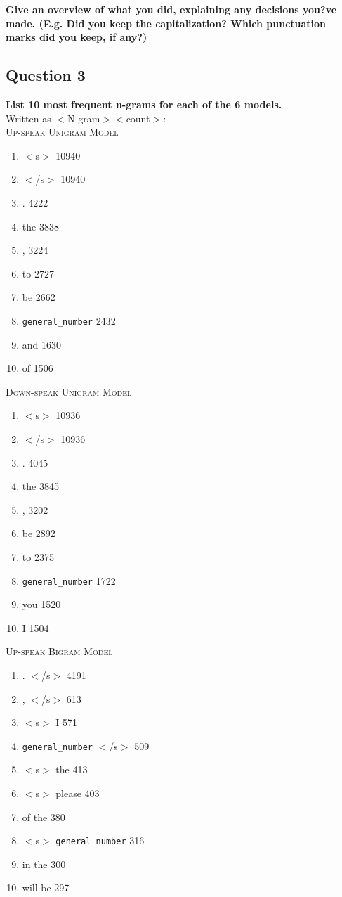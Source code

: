 \documentclass{article} %
\begin{document}
\textbf{Give an overview of what you did, explaining any decisions you?ve made. (E.g. Did you keep the capitalization? Which punctuation marks did you keep, if any?)}
\\


\lipsum[2] %

\subsection*{Question 3}

\textbf{List 10 most frequent n-grams for each of the 6 models.}
\\

Written as $<$N-gram$> <$count$>$:\\

\textsc{Up-speak Unigram Model}\\
\begin{enumerate}
\item $<$s$>$ 10940
\item $<$/s$>$ 10940
\item . 4222
\item the 3838
\item , 3224
\item to 2727
\item be 2662
\item \texttt{general\_number} 2432
\item and 1630
\item of 1506
\end{enumerate}

\textsc{Down-speak Unigram Model}\\
\begin{enumerate}
\item $<$s$>$ 10936
\item $<$/s$>$ 10936
\item . 4045
\item the 3845
\item , 3202
\item be 2892
\item to 2375
\item \texttt{general\_number} 1722
\item you 1520
\item I 1504
\end{enumerate}

\textsc{Up-speak Bigram Model}\\
\begin{enumerate}
\item . $<$/s$>$ 4191
\item , $<$/s$>$ 613
\item $<$s$>$  I 571
\item \texttt{general\_number} $<$/s$>$ 509
\item $<$s$>$  the 413
\item $<$s$>$  please 403
\item of the 380
\item $<$s$>$ \texttt{general\_number} 316
\item in the 300
\item will be 297
\end{enumerate}
\end{document}
